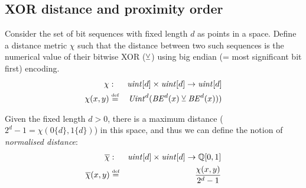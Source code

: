



\subsection{XOR distance and proximity order\statusgreen}\label{sec:proximity}

\begin{definition}\label{def:xor}
Consider the set of bit sequences with fixed length $d$ as points in a space. 
Define a distance metric $\chi$ such that
the distance between two such sequences is the numerical value of their bitwise XOR ($\veebar$) using big endian (= most significant bit first) encoding.
\begin{eqnarray}
\chi&:&\mathit{uint}[d] \times\mathit{uint}[d]\to\mathit{uint}[d]\\
\chi(x, y) &\overset{\textrm{\tiny def}}{=}& \mathit{Uint}^{d}(\mathit{BE}
^{d}(x)  \veebar \mathit{BE}
^{d}(x)))
\end{eqnarray}

Given the fixed length $d>0$, there is a maximum distance ($2^d-1 = \chi(0\{d\},1\{d\})$) in this space, and thus we can define the notion of \emph{normalised distance}:
%
\begin{eqnarray}
\overline{\chi}&:& \mathit{uint}[d] \times\mathit{uint}[d]\to\mathbb{Q}[0,1]\\
\overline{\chi}(x, y) &\overset{\textrm{\tiny def}}{=} &\frac{\chi(x,y)}{2^d-1}
\end{eqnarray}
\end{definition}



